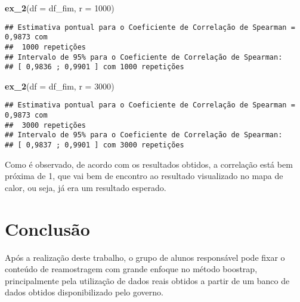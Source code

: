 \documentclass[11pt,]{article}
\newenvironment{Shaded}{\begin{snugshade}}{\end{snugshade}}
\newcommand{\DataTypeTok}[1]{\textcolor[rgb]{0.13,0.29,0.53}{#1}}
\newcommand{\DecValTok}[1]{\textcolor[rgb]{0.00,0.00,0.81}{#1}}
\newcommand{\KeywordTok}[1]{\textcolor[rgb]{0.13,0.29,0.53}{\textbf{#1}}}
\newcommand{\NormalTok}[1]{#1}
\begin{document}
\begin{Shaded}
\begin{Highlighting}[]
\KeywordTok{ex_2}\NormalTok{(}\DataTypeTok{df =}\NormalTok{ df_fim, }\DataTypeTok{r =} \DecValTok{1000}\NormalTok{)}
\end{Highlighting}
\end{Shaded}

\begin{verbatim}
## Estimativa pontual para o Coeficiente de Correlação de Spearman =  0,9873 com
##  1000 repetições
## Intervalo de 95% para o Coeficiente de Correlação de Spearman:
## [ 0,9836 ; 0,9901 ] com 1000 repetições
\end{verbatim}

\begin{Shaded}
\begin{Highlighting}[]
\KeywordTok{ex_2}\NormalTok{(}\DataTypeTok{df =}\NormalTok{ df_fim, }\DataTypeTok{r =} \DecValTok{3000}\NormalTok{)}
\end{Highlighting}
\end{Shaded}

\begin{verbatim}
## Estimativa pontual para o Coeficiente de Correlação de Spearman =  0,9873 com
##  3000 repetições
## Intervalo de 95% para o Coeficiente de Correlação de Spearman:
## [ 0,9837 ; 0,9901 ] com 3000 repetições
\end{verbatim}

Como é observado, de acordo com os resultados obtidos, a correlação está
bem próxima de 1, que vai bem de encontro ao resultado visualizado no
mapa de calor, ou seja, já era um resultado esperado.

\hypertarget{conclusuxe3o}{%
\section{Conclusão}\label{conclusuxe3o}}

Após a realização deste trabalho, o grupo de alunos responsável pode
fixar o conteúdo de reamostragem com grande enfoque no método boostrap,
principalmente pela utilização de dados reais obtidos a partir de um
banco de dados obtidos disponibilizado pelo governo.
\end{document}
